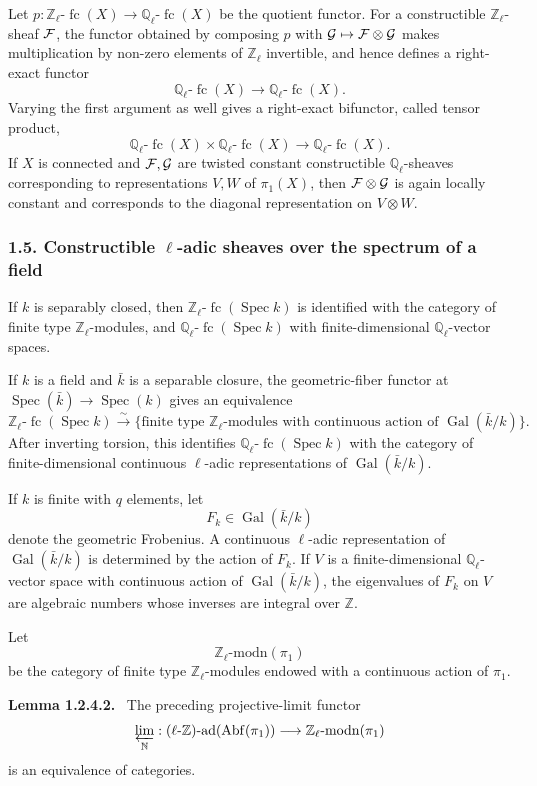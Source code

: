 \documentclass[11pt]{article}
\theoremstyle{plain}
\theoremstyle{definition}
\theoremstyle{remark}
\newenvironment{statement}[1]{\par\medskip\noindent\textbf{#1.}\ }{\par\medskip}
\newcommand{\bN}{\mathbb N}
\newcommand{\bQ}{\mathbb Q}
\newcommand{\bZ}{\mathbb Z}
\newcommand{\cG}{\mathcal G}\newcommand{\cH}{\mathcal H}\newcommand{\cI}{\mathcal I}
\DeclareMathOperator{\Spec}{Spec}
\DeclareMathOperator{\Gal}{Gal}
\providecommand{\fc}{\operatorname{fc}}
\begin{document}
Let $p:\bZ_\ell\text{-}\fc(X)\to\bQ_\ell\text{-}\fc(X)$ be the quotient functor. For a
constructible $\bZ_\ell$-sheaf $\mathcal F$, the functor obtained by composing $p$ with
$\cG\mapsto\cF\otimes\cG$ makes multiplication by non-zero elements of
$\bZ_\ell$ invertible, and hence defines a right-exact functor
\[
       \bQ_\ell\text{-}\fc(X)\longrightarrow\bQ_\ell\text{-}\fc(X).
\]
Varying the first argument as well gives a right-exact bifunctor, called tensor
product,
\[
       \bQ_\ell\text{-}\fc(X)\times\bQ_\ell\text{-}\fc(X)
       \longrightarrow\bQ_\ell\text{-}\fc(X).
\]
If $X$ is connected and $\cF,\cG$ are twisted constant constructible
$\bQ_\ell$-sheaves corresponding to representations $V,W$ of $\pi_1(X)$, then
$\cF\otimes\cG$ is again locally constant and corresponds to the diagonal
representation on $V\otimes W$.

\subsubsection*{1.5. Constructible $\ell$-adic sheaves over the spectrum of a field}

If $k$ is separably closed, then
$\bZ_\ell\text{-}\fc(\Spec k)$ is identified with the category of finite type
$\bZ_\ell$-modules, and $\bQ_\ell\text{-}\fc(\Spec k)$ with finite-dimensional
$\bQ_\ell$-vector spaces.

If $k$ is a field and $\bar k$ is a separable closure, the geometric-fiber functor at
$\Spec(\bar k)\to\Spec(k)$ gives an equivalence
\[
\bZ_\ell\text{-}\fc(\Spec k)\xrightarrow{\sim}
\{\text{finite type }\bZ_\ell\text{-modules with continuous action of }
\Gal(\bar k/k)\}.
\]
After inverting torsion, this identifies $\bQ_\ell\text{-}\fc(\Spec k)$ with the
category of finite-dimensional continuous $\ell$-adic representations of
$\Gal(\bar k/k)$.

If $k$ is finite with $q$ elements, let
\[
        F_k\in\Gal(\bar k/k)
\]
denote the geometric Frobenius. A continuous $\ell$-adic representation of
$\Gal(\bar k/k)$ is determined by the action of $F_k$. If $V$ is a finite-dimensional
$\bQ_\ell$-vector space with continuous action of $\Gal(\bar k/k)$, the eigenvalues
of $F_k$ on $V$ are algebraic numbers whose inverses are integral over $\bZ$.

Let
\[
       \bZ_\ell\text{-}\mathrm{modn}(\pi_1)
\]
be the category of finite type $\bZ_\ell$-modules endowed with a continuous action of
$\pi_1$.

\begin{statement}{Lemma 1.2.4.2}
The preceding projective-limit functor
\[
\varprojlim_{\bN}:(\ell\text{-}\bZ)\text{-}\mathrm{ad}(\mathrm{Abf}(\pi_1))
\longrightarrow
\bZ_\ell\text{-}\mathrm{modn}(\pi_1)
\]
is an equivalence of categories.
\end{statement}
\end{document}
